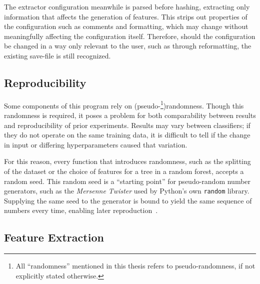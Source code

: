 The extractor configuration meanwhile is parsed before hashing, extracting only
information that affects the generation of features. This strips out properties
of the configuration such as comments and formatting, which may change without
meaningfully affecting the configuration itself. Therefore, should the 
configuration be changed in a way only relevant to the user, such as through 
reformatting, the existing save-file is still recognized.


\subsection{Reproducibility}\label{sec:randomness}

Some components of this program rely on (pseudo-\footnote{All \enquote{randomness}
mentioned in this thesis refers to pseudo-randomness, if not explicitly stated 
otherwise.})randomness. Though this randomness is required, it poses a problem 
for both comparability between results and  reproducibility of prior 
experiments. Results may vary between classifiers; if they do not operate on the
same training data, it is difficult to tell if the change in input or differing
hyperparameters caused that variation. 

For this reason, every function that introduces randomness, such as the 
splitting of the dataset or the choice of features for a tree in a random 
forest, accepts a random seed. This random seed is a \enquote{starting point} 
for pseudo-random number generators, such as the \textit{Mersenne Twister} used
by Python's own \texttt{random} library. Supplying the same seed to the 
generator is bound to yield the same sequence of numbers every time, 
enabling later reproduction~\cite{mersenne_twister,python_ref}.




\subsection{Feature Extraction}\label{sec:feature_extraction}


